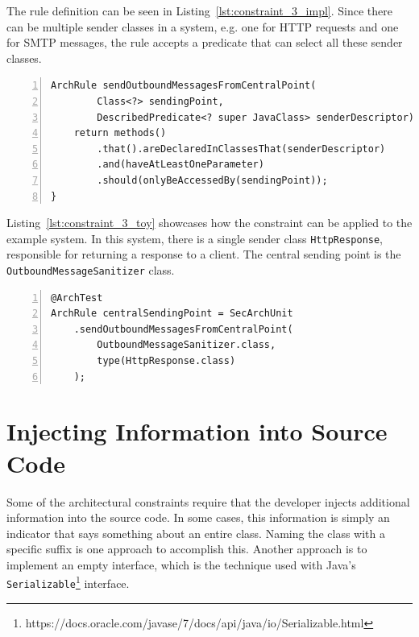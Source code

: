 The rule definition can be seen in Listing~\ref{lst:constraint_3_impl}. Since there can be multiple sender classes in a system, e.g. one for HTTP requests and one for SMTP messages, the rule accepts a predicate that can select all these sender classes.

\begin{minipage}{\linewidth}
\begin{lstlisting}[caption={Rule definition for constraint 3.}, captionpos=b, label=lst:constraint_3_impl, numbers=left]
ArchRule sendOutboundMessagesFromCentralPoint(
        Class<?> sendingPoint,
        DescribedPredicate<? super JavaClass> senderDescriptor) {
    return methods()
        .that().areDeclaredInClassesThat(senderDescriptor)
        .and(haveAtLeastOneParameter)
        .should(onlyBeAccessedBy(sendingPoint));
}
\end{lstlisting}
\end{minipage}

Listing~\ref{lst:constraint_3_toy} showcases how the constraint can be applied to the example system. In this system, there is a single sender class \texttt{HttpResponse}, responsible for returning a response to a client. The central sending point is the \texttt{OutboundMessageSanitizer} class. 

\begin{minipage}{\linewidth}
\begin{lstlisting}[caption={Application of constraint 3 to the example system.}, captionpos=b, label=lst:constraint_3_toy, numbers=left]
@ArchTest
ArchRule centralSendingPoint = SecArchUnit
    .sendOutboundMessagesFromCentralPoint(
        OutboundMessageSanitizer.class,
        type(HttpResponse.class)
    );
\end{lstlisting}
\end{minipage}




\section{Injecting Information into Source Code}

Some of the architectural constraints require that the developer injects additional information into the source code. In some cases, this information is simply an indicator that says something about an entire class. Naming the class with a specific suffix is one approach to accomplish this. Another approach is to implement an empty interface, which is the technique used with Java's \texttt{Serializable}\footnote{https://docs.oracle.com/javase/7/docs/api/java/io/Serializable.html} interface. 

